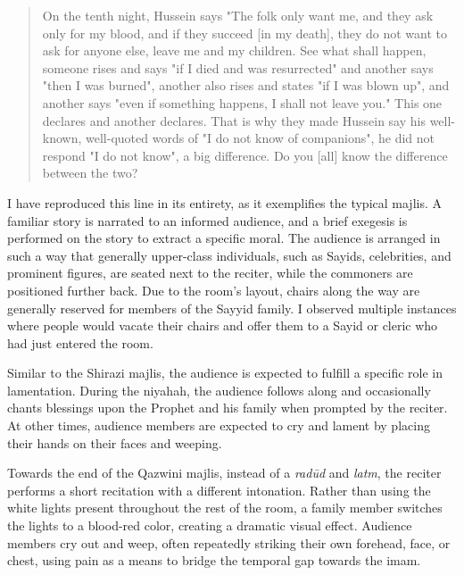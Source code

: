 \begin{quote}
On the tenth night, Hussein says "The folk only want me, and they ask only for my blood, and if they succeed [in my death], they do not want to ask for anyone else, leave me and my children. See what shall happen, someone rises and says "if I died and was resurrected" and another says "then I was burned", another also rises and states "if I was blown up", and another says "even if something happens, I shall not leave you." This one declares and another declares. That is why they made Hussein say his well-known, well-quoted words of "I do not know of companions", he did not respond "I do not know", a big difference. Do you [all] know the difference between the two?
\end{quote}


I have reproduced this line in its entirety, as it exemplifies the typical majlis. A familiar story is narrated to an informed audience, and a brief exegesis is performed on the story to extract a specific moral. The audience is arranged in such a way that generally upper-class individuals, such as Sayids, celebrities, and prominent figures, are seated next to the reciter, while the commoners are positioned further back. Due to the room's layout, chairs along the way are generally reserved for members of the Sayyid family. I observed multiple instances where people would vacate their chairs and offer them to a Sayid or cleric who had just entered the room.

Similar to the Shirazi majlis, the audience is expected to fulfill a specific role in lamentation. During the niyahah, the audience follows along and occasionally chants blessings upon the Prophet and his family when prompted by the reciter. At other times, audience members are expected to cry and lament by placing their hands on their faces and weeping.

Towards the end of the Qazwini majlis, instead of a \emph{radūd} and \emph{latm}, the reciter performs a short recitation with a different intonation. Rather than using the white lights present throughout the rest of the room, a family member switches the lights to a blood-red color, creating a dramatic visual effect. Audience members cry out and weep, often repeatedly striking their own forehead, face, or chest, using pain as a means to bridge the temporal gap towards the imam.


